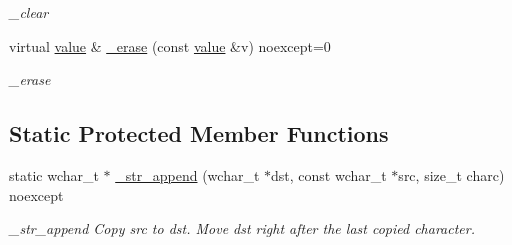 \begin{DoxyCompactItemize}
\begin{DoxyCompactList}\small\item\em \+\_\+clear \end{DoxyCompactList}\item 
virtual \hyperlink{classformat_1_1value}{value} \& \hyperlink{classformat_1_1value_a75537c78ab53ac7657eea750b94259b3}{\+\_\+erase} (const \hyperlink{classformat_1_1value}{value} \&v) noexcept=0
\begin{DoxyCompactList}\small\item\em \+\_\+erase \end{DoxyCompactList}\end{DoxyCompactItemize}
\subsection*{Static Protected Member Functions}
\begin{DoxyCompactItemize}
\item 
static wchar\+\_\+t $\ast$ \hyperlink{classformat_1_1value_a5d029f82ccef1f9df32f617baf32e41d}{\+\_\+str\+\_\+append} (wchar\+\_\+t $\ast$dst, const wchar\+\_\+t $\ast$src, size\+\_\+t charc) noexcept
\begin{DoxyCompactList}\small\item\em \+\_\+str\+\_\+append Copy src to dst. Move dst right after the last copied character. \end{DoxyCompactList}\end{DoxyCompactItemize}
